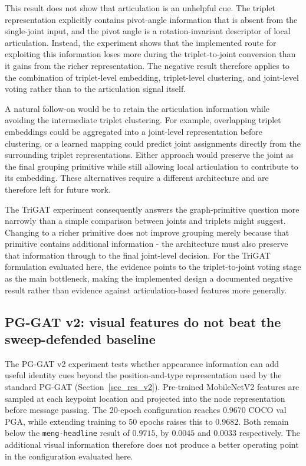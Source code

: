 This result does not show that articulation is an unhelpful cue.
The triplet representation explicitly contains pivot-angle information
that is absent from the single-joint input,
and the pivot angle is a rotation-invariant descriptor of local
articulation.
Instead, the experiment shows that the implemented route for exploiting
this information loses more during the triplet-to-joint conversion than
it gains from the richer representation.
The negative result therefore applies to the combination of triplet-level
embedding,
triplet-level clustering,
and joint-level voting rather than to the articulation signal itself.

A natural follow-on would be to retain the articulation information
while avoiding the intermediate triplet clustering.
For example, overlapping triplet embeddings could be aggregated into a
joint-level representation before clustering,
or a learned mapping could predict joint assignments directly from the
surrounding triplet representations.
Either approach would preserve the joint as the final grouping primitive
while still allowing local articulation to contribute to its embedding.
These alternatives require a different architecture and are therefore
left for future work.

The TriGAT experiment consequently answers the graph-primitive question
more narrowly than a simple comparison between joints and triplets might
suggest.
Changing to a richer primitive does not improve grouping merely because
that primitive contains additional information -
the architecture must also preserve that information through to the
final joint-level decision.
For the TriGAT formulation evaluated here,
the evidence points to the triplet-to-joint voting stage as the main
bottleneck,
making the implemented design a documented negative result rather than
evidence against articulation-based features more generally.


\subsection{PG-GAT v2: visual features do not beat the sweep-defended baseline}
\label{sec_disc_transfer_v2}

The PG-GAT v2 experiment tests whether appearance information can add
useful identity cues beyond the position-and-type representation used by
the standard PG-GAT (Section~\ref{sec_res_v2}).
Pre-trained MobileNetV2 features are sampled at each keypoint location
and projected into the node representation before message passing.
The 20-epoch configuration reaches $0.9670$ COCO val PGA,
while extending training to 50 epochs raises this to $0.9682$.
Both remain below the \texttt{meng-headline} result of $0.9715$,
by $0.0045$ and $0.0033$ respectively.
The additional visual information therefore does not produce a better
operating point in the configuration evaluated here.

